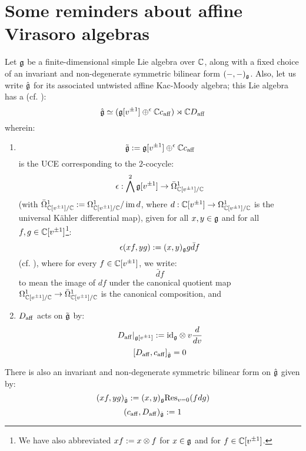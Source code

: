     \section{Some reminders about affine Virasoro algebras}
        Let $\mathfrak{g}$ be a finite-dimensional simple Lie algebra over $\mathbb{C}$, along with a fixed choice of an invariant and non-degenerate symmetric bilinear form $(-, -)_{\mathfrak{g}}$. Also, let us write $\hat{\mathfrak{g}}$ for its associated untwisted affine Kac-Moody algebra; this Lie algebra has a  (cf. \cite[Chapter 7]{kac_infinite_dimensional_lie_algebras}):
            $$\hat{\mathfrak{g}} \simeq ( \mathfrak{g}[v^{\pm 1}] \oplus^{\epsilon} \mathbb{C} c_{\mathrm{aff}} ) \rtimes \mathbb{C} D_{\mathrm{aff}}$$
        wherein:
        \begin{enumerate}
            \item
                $$\tilde{\mathfrak{g}} := \mathfrak{g}[v^{\pm 1}] \oplus^{\epsilon} \mathbb{C} c_{\mathrm{aff}}$$
            is the UCE corresponding to the $2$-cocycle:
                $$\epsilon: \bigwedge^2 \mathfrak{g}[v^{\pm 1}] \to \bar{\Omega}^1_{\mathbb{C}[v^{\pm 1}]/\mathbb{C}}$$
            (with $\bar{\Omega}^1_{\mathbb{C}[v^{\pm 1}]/\mathbb{C}} := \Omega^1_{\mathbb{C}[v^{\pm 1}]/\mathbb{C}}/\operatorname{im} d$, where $d: \mathbb{C}[v^{\pm 1}] \to \Omega^1_{\mathbb{C}[v^{\pm 1}]/\mathbb{C}}$ is the universal K\"ahler differential map), given for all $x, y \in \mathfrak{g}$ and for all $f, g \in \mathbb{C}[v^{\pm 1}]$\footnote{We have also abbreviated $xf := x \tensor f$ for $x \in \mathfrak{g}$ and for $f \in \mathbb{C}[v^{\pm 1}]$.}:
                $$\epsilon(xf, yg) := (x, y)_{\mathfrak{g}} g\bar{d}f$$
            (cf. \cite{kassel_universal_central_extensions_of_lie_algebras}), where for every $f \in \mathbb{C}[v^{\pm 1}]$, we write:
                $$\bar{d}f$$
            to mean the image of $df$ under the canonical quotient map $\Omega^1_{\mathbb{C}[v^{\pm 1}]/\mathbb{C}} \to \bar{\Omega}^1_{\mathbb{C}[v^{\pm 1}]/\mathbb{C}}$ is the canonical composition, and
            \item $D_{\mathrm{aff}}$ acts on $\tilde{\mathfrak{g}}$ by:
                $$D_{\aff}|_{\g[v^{\pm 1}]} := \id_{\g} \tensor v \frac{d}{dv}$$
                $$[D_{\mathrm{aff}}, c_{\mathrm{aff}}]_{\hat{\mathfrak{g}}} = 0$$
        \end{enumerate}
        There is also an invariant and non-degenerate symmetric bilinear form on $\hat{\mathfrak{g}}$ given by:
            $$(xf, yg)_{\hat{\mathfrak{g}}} := (x, y)_{\mathfrak{g}} \mathrm{Res}_{v = 0}(f dg)$$
            $$(c_{\mathrm{aff}}, D_{\mathrm{aff}})_{\hat{\mathfrak{g}}} := 1$$

